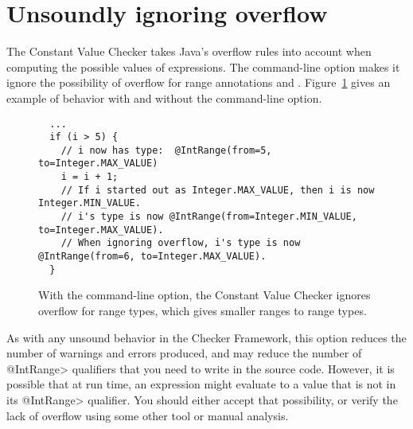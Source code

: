 \section{Unsoundly ignoring overflow\label{value-checker-overflow}}

The Constant Value Checker takes Java's overflow rules into account when
computing the possible values of expressions.
%
The  command-line option makes it ignore the
possibility of overflow for range annotations
 and
.
%
Figure~\ref{fig-value-ignore-overflow} gives an example of behavior with
and without the  command-line option.

\begin{figure}
\begin{Verbatim}
  ...
  if (i > 5) {
    // i now has type:  @IntRange(from=5, to=Integer.MAX_VALUE)
    i = i + 1;
    // If i started out as Integer.MAX_VALUE, then i is now Integer.MIN_VALUE.
    // i's type is now @IntRange(from=Integer.MIN_VALUE, to=Integer.MAX_VALUE).
    // When ignoring overflow, i's type is now @IntRange(from=6, to=Integer.MAX_VALUE).
  }
\end{Verbatim}
\caption{With the  command-line option,
the Constant Value Checker ignores overflow
for range types, which gives smaller ranges to range types.}
\label{fig-value-ignore-overflow}
\end{figure}

As with any unsound behavior in the Checker Framework, this option reduces
the number of warnings and errors produced, and may reduce the number of
\<@IntRange> qualifiers that you need to write in the source code.
However, it is possible that at run time, an expression might evaluate to a
value that is not in its \<@IntRange> qualifier.  You should either accept
that possibility, or verify the lack of overflow using some other tool or
manual analysis.


